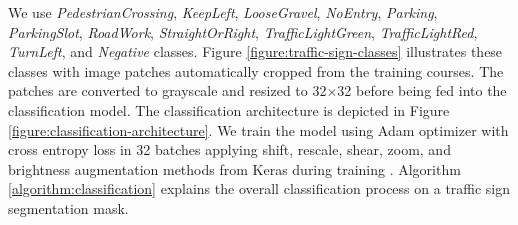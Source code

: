 We use \textit{PedestrianCrossing}, \textit{KeepLeft}, \textit{LooseGravel},
\textit{NoEntry}, \textit{Parking}, \textit{ParkingSlot}, \textit{RoadWork},
\textit{StraightOrRight}, \textit{TrafficLightGreen}, \textit{TrafficLightRed},
\textit{TurnLeft}, and \textit{Negative} classes. Figure
\ref{figure:traffic-sign-classes} illustrates these classes with image patches
automatically cropped from the training courses. The patches are converted to
grayscale and resized to 32$\times$32 before being fed into the classification
model. The classification architecture is depicted in Figure
\ref{figure:classification-architecture}. We train the model using Adam
optimizer with cross entropy loss in 32 batches applying shift, rescale, shear,
zoom, and brightness augmentation methods from Keras during
training \cite{Abadi2015TF, Chollet2015Keras}. Algorithm
\ref{algorithm:classification} explains the overall classification process on a
traffic sign segmentation mask.

